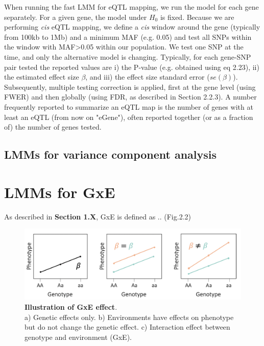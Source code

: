When running the fast LMM for eQTL mapping, we run the model for each gene separately.
For a given gene, the model under $H_0$ is fixed.
Because we are performing \textit{cis} eQTL mapping, we define a \textit{cis} window around the gene (typically from 100kb to 1Mb) and a minimum MAF (e.g. 0.05) and test all SNPs within the window with MAF>0.05 within our population.  
We test one SNP at the time, and only the alternative model is changing.
Typically, for each gene-SNP pair tested the reported values are i) the P-value (e.g. obtained using eq 2.23), ii) the estimated effect size $\beta$, and iii) the effect size standard error ($se(\beta)$).
Subsequently, multiple testing correction is applied, first at the gene level (using FWER) and then globally (using FDR, as described in Section 2.2.3).
A number frequently reported to summarize an eQTL map is the number of genes with at least an eQTL (from now on "eGene"), often reported together (or as a fraction of) the number of genes tested.

\subsection{LMMs for variance component analysis}

\newpage 


\section{LMMs for GxE}

As described in \textbf{Section 1.X}, GxE is defined as .. (Fig.2.2)

\begin{figure}[h]
\centering
\includegraphics[width=15cm]{Chapter1/Fig/GxE.png}
\caption{\textbf{Illustration of GxE effect}.\\
a) Genetic effects only. b) Environments have effects on phenotype but do not change the genetic effect. c) Interaction effect between genotype and environment (GxE).}
\end{figure}

